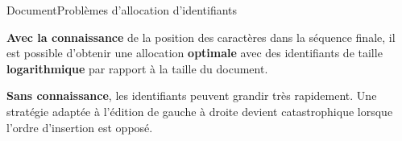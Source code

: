 
  
  

  
%     


\begin{frame}{Document}{Problèmes d'allocation d'identifiants}

  \textbf{Avec la connaissance} de la position des caractères dans la séquence
  finale, il est possible d'obtenir une allocation \textbf{optimale} avec des
  identifiants de taille \textbf{logarithmique} par rapport à la taille du document.

  \vspace{0.1cm}

  \begin{center}
  
  \end{center}

  \vspace{0.25cm}

  \textbf{Sans connaissance}, les identifiants peuvent grandir très
  rapidement. Une stratégie adaptée à l'édition de gauche à droite devient
  catastrophique lorsque l'ordre d'insertion est opposé.

  
  \vspace{0.1cm}

  \begin{center}
    
  \end{center}

\end{frame}


